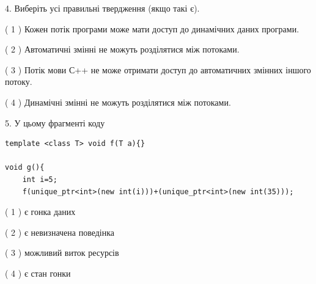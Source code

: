 \documentclass[12pt, ukrainian]{article}
\begin{document}
\begin {large}
{%
4. Виберіть усі правильні твердження (якщо такі є).\par
\vspace{2mm}

( 1 ) Кожен потік програми може мати доступ до динамічних даних програми.%

( 2 ) Автоматичні змінні не можуть розділятися між потоками.%

( 3 ) Потік мови С++ не може отримати доступ до автоматичних змінних іншого потоку.%

( 4 ) Динамічні змінні не можуть розділятися між потоками.%


5. У цьому фрагменті коду
\begin{verbatim}
template <class T> void f(T a){}

void g(){
    int i=5;
    f(unique_ptr<int>(new int(i)))+(unique_ptr<int>(new int(35)));
\end{verbatim}
( 1 ) є гонка даних%

( 2 ) є невизначена поведінка%

( 3 ) можливий виток ресурсів%

( 4 ) є стан гонки%
}
\end {large}
\end{document}
